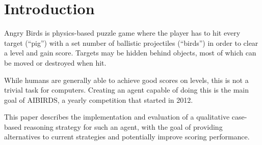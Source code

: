 \section{Introduction}\label{sec:intro}

Angry Birds is physics-based puzzle game where the player has to hit every target (``pig'') with a set number of ballistic projectiles (``birds'') in order to clear a level and gain score.
Targets may be hidden behind objects, most of which can be moved or destroyed when hit.

While humans are generally able to achieve good scores on levels, this is not a trivial task for computers.
Creating an agent capable of doing this is the main goal of AIBIRDS, a yearly competition that started in 2012.\cite{Renz2015AIBIRDSTA}

This paper describes the implementation and evaluation of a qualitative case-based reasoning strategy for such an agent, with the goal of providing alternatives to current strategies and potentially improve scoring performance.


